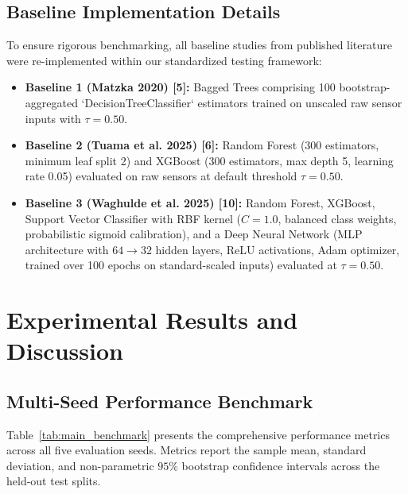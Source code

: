 \documentclass[conference]{IEEEtran}
\begin{document}
\subsection{Baseline Implementation Details}
To ensure rigorous benchmarking, all baseline studies from published literature were re-implemented within our standardized testing framework:
\begin{itemize}
    \item \textbf{Baseline 1 (Matzka 2020) [5]:} Bagged Trees comprising 100 bootstrap-aggregated `DecisionTreeClassifier` estimators trained on unscaled raw sensor inputs with $\tau = 0.50$.
    \item \textbf{Baseline 2 (Tuama et al. 2025) [6]:} Random Forest (300 estimators, minimum leaf split 2) and XGBoost (300 estimators, max depth 5, learning rate 0.05) evaluated on raw sensors at default threshold $\tau = 0.50$.
    \item \textbf{Baseline 3 (Waghulde et al. 2025) [10]:} Random Forest, XGBoost, Support Vector Classifier with RBF kernel ($C=1.0$, balanced class weights, probabilistic sigmoid calibration), and a Deep Neural Network (MLP architecture with $64 \rightarrow 32$ hidden layers, ReLU activations, Adam optimizer, trained over 100 epochs on standard-scaled inputs) evaluated at $\tau = 0.50$.
\end{itemize}

\section{Experimental Results and Discussion}

\subsection{Multi-Seed Performance Benchmark}
Table~\ref{tab:main_benchmark} presents the comprehensive performance metrics across all five evaluation seeds. Metrics report the sample mean, standard deviation, and non-parametric $95\%$ bootstrap confidence intervals across the held-out test splits.
\end{document}
